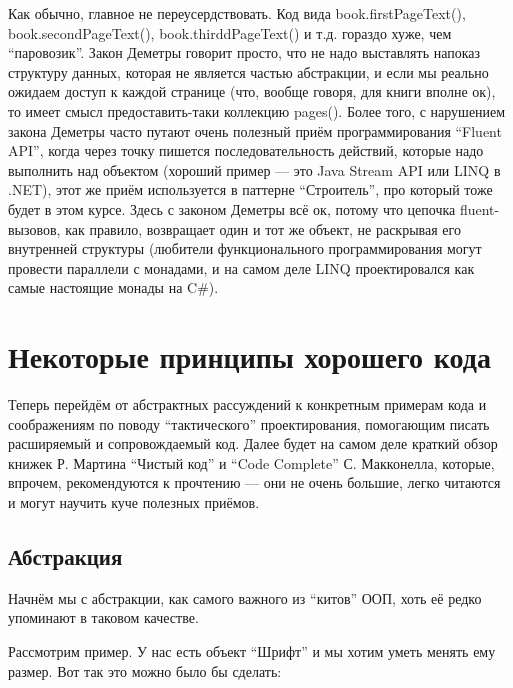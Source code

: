 \documentclass[a5paper]{article}
\begin{document}
Как обычно, главное не переусердствовать. Код вида book.firstPageText(), book.secondPageText(), book.thirddPageText() и т.д. гораздо хуже, чем ``паровозик''. Закон Деметры говорит просто, что не надо выставлять напоказ структуру данных, которая не является частью абстракции, и если мы реально ожидаем доступ к каждой странице (что, вообще говоря, для книги вполне ок), то имеет смысл предоставить-таки коллекцию pages(). Более того, с нарушением закона Деметры часто путают очень полезный приём программирования ``Fluent API'', когда через точку пишется последовательность действий, которые надо выполнить над объектом (хороший пример --- это Java Stream API или LINQ в .NET), этот же приём используется в паттерне ``Строитель'', про который тоже будет в этом курсе. Здесь с законом Деметры всё ок, потому что цепочка fluent-вызовов, как правило, возвращает один и тот же объект, не раскрывая его внутренней структуры (любители функционального программирования могут провести параллели с монадами, и на самом деле LINQ проектировался как самые настоящие монады на C\#).

\section{Некоторые принципы хорошего кода}

Теперь перейдём от абстрактных рассуждений к конкретным примерам кода и соображениям по поводу ``тактического'' проектирования, помогающим писать расширяемый и сопровождаемый код. Далее будет на самом деле краткий обзор книжек Р. Мартина ``Чистый код'' и ``Code Complete'' С. Макконелла, которые, впрочем, рекомендуются к прочтению --- они не очень большие, легко читаются и могут научить куче полезных приёмов.

\subsection{Абстракция}

Начнём мы с абстракции, как самого важного из ``китов'' ООП, хоть её редко упоминают в таковом качестве.

Рассмотрим пример. У нас есть объект ``Шрифт'' и мы хотим уметь менять ему размер. Вот так это можно было бы сделать:
\end{document}
